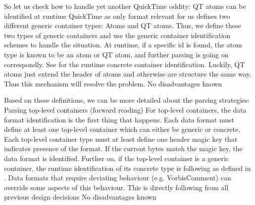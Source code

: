 So let us check how to handle yet another QuickTime oddity:
{%
QT atoms can be identified at runtime
}
{%
QuickTime as only format relevant for us defines two different generic container types: Atoms and QT atoms. Thus, we define these two types of generic containers and use the generic container identification schemes to handle the situation. At runtime, if a specific id is found, the atom type is known to be an atom or QT atom, and further parsing is going on correspondly. See  for the runtime concrete container identification.
}
{%
Luckily, QT atoms just extend the header of atoms and otherwise are structure the same way. Thus this mechanism will resolve the problem.
}
{%
No disadvantages known
}

Based on these definitions, we can be more detailed about the parsing strategies:
{%
Parsing top-level containers (forward reading)
}
{%
For top-level containers, the data format identification is the first thing that happens. Each data format must define at least one top-level container which can either be generic or concrete. Each top-level container type must at least define one header magic key that indicates presence of the format. If the current bytes match the magic key, the data format is identified. Further on, if the top-level container is a generic container, the runtime identification of its concrete type is following as defined in . Data formats that require deviating behaviour (e.g. VorbisComment) can override some aspects of this behaviour.
}
{%
This is directly following from all previous design decisions
}
{%
No disadvantages known
}

